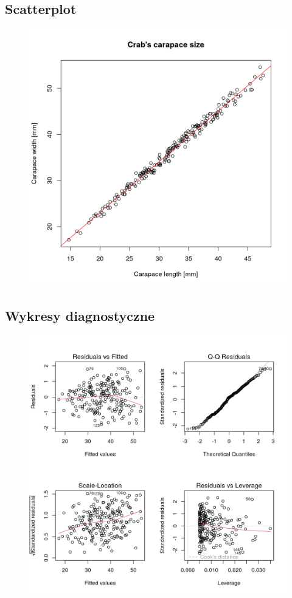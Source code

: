 \documentclass[11pt]{article}
\begin{document}
\pagebreak

\subsection{Scatterplot}
\begin{figure}[h]
\includegraphics[scale=0.5]{scatterplot.png}
\centering
\end{figure}

\subsection{Wykresy diagnostyczne}
\begin{figure}[h]
\includegraphics[scale=0.5]{model_plots.png}
\centering
\end{figure}
\end{document}
